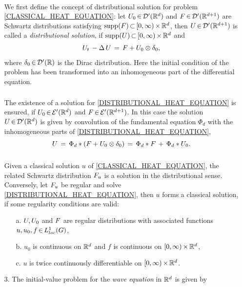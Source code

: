 \documentclass[11pt,twoside]{article}
\begin{document}
\begin{itemize}[leftmargin=4mm]
\paragraph{} %
We first define the concept of distributional solution
for problem \eqref{CLASSICAL_HEAT_EQUATION}:
let $\disU_0 \xeof \D'(\Rd)$ and $\disF \xeof \D'(\R^{d+1})$ are
Schwartz distributions satisfying 
$\supp{\disF} \xsubset [0,\infty) \xtimes \Rd$,
then $\disU \xeof \D'(\R^{d+1})$ is called a \textit{distributional solution},
if $\supp{\disU} \xsubset [0,\infty) \xtimes \Rd$ and
\begin{equation}\label{DISTRIBUTIONAL_HEAT_EQUATION}
\disU_t \, - \Delta \, \disU \= \disF + \disU_0 \otimes \delta_0,
\end{equation}
where $\delta_0 \xeof \D'(\R)$ is the Dirac distribution.
Here the initial condition of the problem has been transformed
into an inhomogeneous part of the differential equation.

\subparagraph{}
The existence of a solution for \eqref{DISTRIBUTIONAL_HEAT_EQUATION}
is ensured,
if $\disU_0 \xeof \E'(\Rd)$ and $\disF \xeof \E'(\R^{d+1})$.
In this case the solution $\disU \xeof \D'(\Rd)$ is given by
convolution of the fundamental equation $\Phi_d$ 
with the inhomogeneous parts of \eqref{DISTRIBUTIONAL_HEAT_EQUATION},
\[
\disU \=
\Phi_d \ast (\disF + \disU_0 \otimes \delta_0) \=
\Phi_d \ast \disF \, + \, \Phi_d \ast \disU_0.
\]

\subparagraph{}
Given a classical solution $u$ of \eqref{CLASSICAL_HEAT_EQUATION},
the related Schwartz distribution $\disF_u$ is a solution
in the distributional sense.
Conversely,
let $\disF_u$ be regular and solve \eqref{DISTRIBUTIONAL_HEAT_EQUATION},
then $u$ forms a classical solution,
if some regularity conditions are valid:

\begin{itemize}[leftmargin=10mm]
\item[a.]
$\disU, \disU_0$ and $\disF$ are regular distributions
with associated functions $u, u_0, f \xeof \Lc$,

\item[b.]
$u_0$ is continuous on $\Rd$ and
$f$ is continuous on $[0,\infty) \xtimes \Rd$,

\item[c.]
$u$ is twice continuously differentiable on $[0,\infty) \xtimes \Rd$.
\end{itemize}

\item[3.]
The initial-value problem for the \textit{wave equation} in $\Rd$
is given by


\end{itemize}
\end{document}
